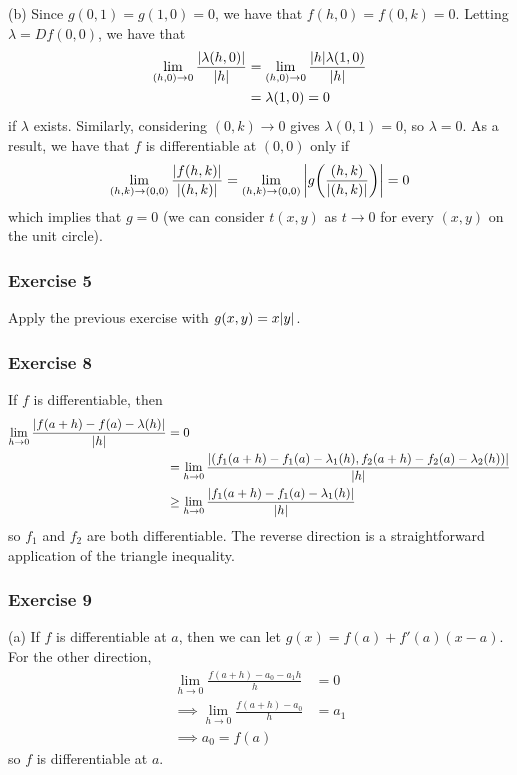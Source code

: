 (b) Since $g(0, 1) = g(1, 0) = 0$, we have that $f(h, 0) = f(0, k) = 0$. Letting $\lambda = Df(0, 0)$, we have
that
\begin{align*}
        \lim_{(h, 0) \to 0} \frac{\abs{\lambda(h, 0)}}{\abs{h}} &= \lim_{(h, 0) \to 0} \frac{\abs{h} \lambda(1, 0)}{\abs{h}} \\
                                                                &= \lambda(1, 0) = 0
\end{align*}
if $\lambda$ exists. Similarly, considering $(0, k) \to 0$ gives $\lambda(0, 1) = 0$, so $\lambda = 0$. 
As a result, we have that $f$ is differentiable at $(0, 0)$ only if
\begin{align*}
        \lim_{(h, k) \to (0, 0)} \frac{\abs{f(h, k)}}{\abs{(h, k)}} = \lim_{(h, k) \to (0, 0)} \abs{g\bigg(\frac{(h, k)}{\abs{(h, k)}}\bigg)} = 0
\end{align*}
which implies that $g = 0$ (we can consider $t(x, y)$ as $t \to 0$ for every $(x, y)$ on the unit circle). 

\subsubsection{Exercise 5}
Apply the previous exercise with $g(x, y) = x\abs{y}$.

\subsubsection{Exercise 8}
If $f$ is differentiable, then
\begin{align*}
        \lim_{h \to 0} \frac{\abs{f(a + h) - f(a) - \lambda(h)}}{\abs{h}} &= 0 \\
                                                                          &= \lim_{h \to 0} \frac{\abs{(f_1(a + h) - f_1(a) - \lambda_1(h), f_2(a + h) - f_2(a) - \lambda_2(h))}}{\abs{h}} \\
                                                                          &\geq \lim_{h \to 0} \frac{\abs{f_1(a + h) - f_1(a) - \lambda_1(h)}}{\abs{h}}
\end{align*}
so $f_1$ and $f_2$ are both differentiable. The reverse direction is a straightforward application of the triangle
inequality.

\subsubsection{Exercise 9}
(a) If $f$ is differentiable at $a$, then we can let $g(x) = f(a) + f'(a) (x - a)$. For the other direction,
\begin{align*}
        \lim_{h \to 0} \frac{f(a + h) - a_0 - a_1h}{h} &= 0 \\
        \implies \lim_{h \to 0} \frac{f(a + h) - a_0}{h} &= a_1 \\
        \implies a_0 = f(a)
\end{align*}
so $f$ is differentiable at $a$.

